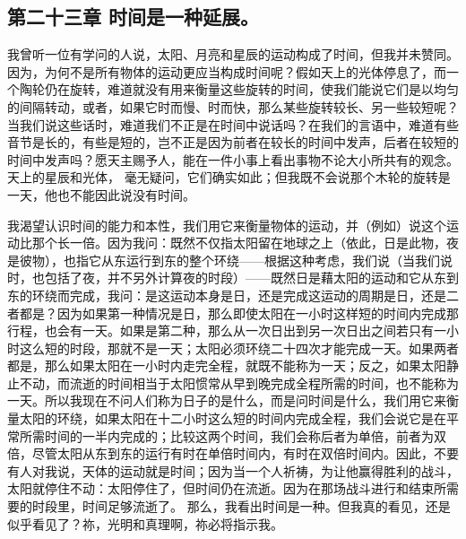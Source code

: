 
\subsection{第二十三章 时间是一种延展。}

我曾听一位有学问的人说，太阳、月亮和星辰的运动构成了时间，但我并未赞同。因为，为何不是所有物体的运动更应当构成时间呢？假如天上的光体停息了，而一个陶轮仍在旋转，难道就没有用来衡量这些旋转的时间，使我们能说它们是以均匀的间隔转动，或者，如果它时而慢、时而快，那么某些旋转较长、另一些较短呢？当我们说这些话时，难道我们不正是在时间中说话吗？在我们的言语中，难道有些音节是长的，有些是短的，岂不正是因为前者在较长的时间中发声，后者在较短的时间中发声吗？愿天主赐予人，能在一件小事上看出事物不论大小所共有的观念。天上的星辰和光体， 毫无疑问，它们确实如此；但我既不会说那个木轮的旋转是一天，他也不能因此说没有时间。\par

我渴望认识时间的能力和本性，我们用它来衡量物体的运动，并（例如）说这个运动比那个长一倍。因为我问：既然不仅指太阳留在地球之上（依此，日是此物，夜是彼物），也指它从东运行到东的整个环绕——根据这种考虑，我们说（当我们说时，也包括了夜，并不另外计算夜的时段）——既然日是藉太阳的运动和它从东到东的环绕而完成，我问：是这运动本身是日，还是完成这运动的周期是日，还是二者都是？因为如果第一种情况是日，那么即使太阳在一小时这样短的时间内完成那行程，也会有一天。如果是第二种，那么从一次日出到另一次日出之间若只有一小时这么短的时段，那就不是一天；太阳必须环绕二十四次才能完成一天。如果两者都是，那么如果太阳在一小时内走完全程，就既不能称为一天；反之，如果太阳静止不动，而流逝的时间相当于太阳惯常从早到晚完成全程所需的时间，也不能称为一天。所以我现在不问人们称为日子的是什么，而是问时间是什么，我们用它来衡量太阳的环绕，如果太阳在十二小时这么短的时间内完成全程，我们会说它是在平常所需时间的一半内完成的；比较这两个时间，我们会称后者为单倍，前者为双倍，尽管太阳从东到东的运行有时在单倍时间内，有时在双倍时间内。因此，不要有人对我说，天体的运动就是时间；因为当一个人祈祷，为让他赢得胜利的战斗，太阳就停住不动：太阳停住了，但时间仍在流逝。因为在那场战斗进行和结束所需要的时段里，时间足够流逝了。 那么，我看出时间是一种。但我真的看见，还是似乎看见了？祢，光明和真理啊，祢必将指示我。\par


